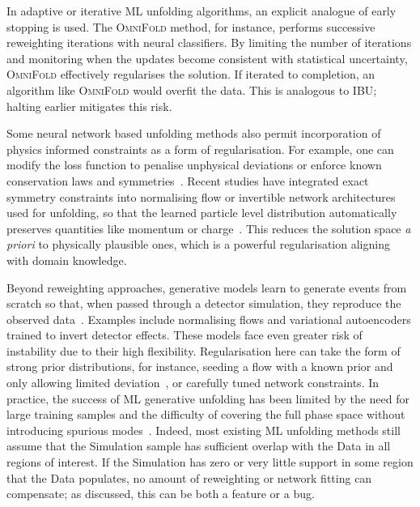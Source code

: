 {{        In adaptive or iterative ML unfolding algorithms, an explicit analogue of early stopping is used.
        The \textsc{OmniFold} method, for instance, performs successive reweighting iterations with neural classifiers.
        By limiting the number of iterations and monitoring when the updates become consistent with statistical uncertainty, \textsc{OmniFold} effectively regularises the solution.
        If iterated to completion, an algorithm like \textsc{OmniFold} would overfit the data.
        This is analogous to IBU; halting earlier mitigates this risk.
        
        Some neural network based unfolding methods also permit incorporation of physics informed constraints as a form of regularisation.
        For example, one can modify the loss function to penalise unphysical deviations or enforce known conservation laws and symmetries~\cite{cui_knowledge-augmented_2022, hepmllivingreview, howard_advancing_2022, lagrave_equivariant_2022, pazos_towards_2024, unke_machine_2021, dopp_data-driven_2023, rieger_rwth}.
        Recent studies have integrated exact symmetry constraints into normalising flow or invertible network architectures used for unfolding, so that the learned particle level distribution automatically preserves quantities like momentum or charge~\cite{Bellagente2020InvertibleAgain, Ackerschott2023ReturningBelong}.
        This reduces the solution space \textit{a priori} to physically plausible ones, which is a powerful regularisation aligning with domain knowledge.

        Beyond reweighting approaches, generative models learn to generate events from scratch so that, when passed through a detector simulation, they reproduce the observed data~\cite{datta_unfolding_2018, Butter2020GANplifyingSamples}.
        Examples include normalising flows and variational autoencoders trained to invert detector effects.
        These models face even greater risk of instability due to their high flexibility.
        Regularisation here can take the form of strong prior distributions, for instance, seeding a flow with a known prior and only allowing limited deviation~\cite{Humble:2022vtm, Huetsch2024TheLearning}, or carefully tuned network constraints.
        In practice, the success of ML generative unfolding has been limited by the need for large training samples and the difficulty of covering the full phase space without introducing spurious modes~\cite{Huetsch2024TheLearning, Canelli:2025ybb}.
        Indeed, most existing ML unfolding methods still assume that the Simulation sample has sufficient overlap with the Data in all regions of interest.
        If the Simulation has zero or very little support in some region that the Data populates, no amount of reweighting or network fitting can compensate; as discussed, this can be both a feature or a bug.

}}
